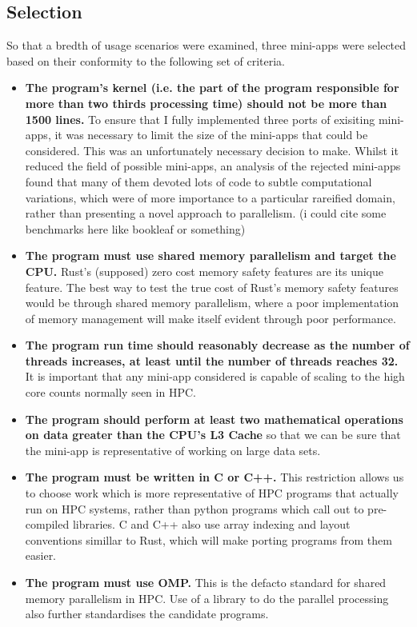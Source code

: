 \documentclass[12pt,a4paper]{report}
\begin{document}
\subsection{Selection}
So that a bredth of usage scenarios were examined, three mini-apps were selected based on their conformity to the following set of criteria.
\begin{itemize}
  \item \textbf{The program's kernel (i.e. the part of the program responsible for more than two thirds processing time) should not be more than 1500 lines.} To ensure that I fully implemented three ports of exisiting mini-apps, it was necessary to limit the size of the mini-apps that could be considered. This was an unfortunately necessary decision to make. Whilst it reduced the field of possible mini-apps, an analysis of the rejected mini-apps found that many of them devoted lots of code to subtle computational variations, which were of more importance to a particular rareified domain, rather than presenting a novel approach to parallelism. (i could cite some benchmarks here like bookleaf or something)

  \item \textbf{The program must use shared memory parallelism and target the CPU.} Rust's (supposed) zero cost memory safety features are its unique feature. The best way to test the true cost of Rust's memory safety features would be through shared memory parallelism, where a poor implementation of memory management will make itself evident through poor performance.

  \item \textbf{The program run time should reasonably decrease as the number of threads increases, at least until the number of threads reaches 32.} It is important that any mini-app considered is capable of scaling to the high core counts normally seen in HPC.

  \item \textbf{The program should perform at least two mathematical operations on data greater than the CPU's L3 Cache} so that we can be sure that the mini-app is representative of working on large data sets.

  \item \textbf{The program must be written in C or C++.} This restriction allows us to choose work which is more representative of HPC programs that actually run on HPC systems, rather than python programs which call out to pre-compiled libraries. C and C++ also use array indexing and layout conventions simillar to Rust, which will make porting programs from them easier.

  \item \textbf{The program must use OMP.} This is the defacto standard for shared memory parallelism in HPC. Use of a library to do the parallel processing also further standardises the candidate programs.
\end{itemize}
\end{document}
